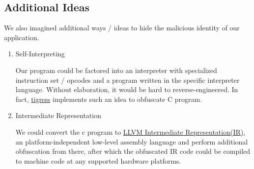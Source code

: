 \documentclass[11pt]{article}
\begin{document}
\subsection{Additional Ideas}
We also imagined additional ways / ideas to hide the malicious identity of our application.
\begin{enumerate}
    \item Self-Interpreting \par
    Our program could be factored into an interpreter with specialized instruction set / opcodes and a program written in the specific interpreter language. Without elaboration, it would be hard to reverse-engineered. In fact, \href{http://tigress.cs.arizona.edu/index.html}{tigress} implements such an idea to obfuscate C program.
    \item Intermediate Representation\par
    We could convert the c program to \href{https://llvm.org/docs/index.html}{LLVM Intermediate Representation(IR)}, an platform-independent low-level assembly language and perform additional obfuscation from there, after which the obfuscated IR code could be compiled to machine code at any supported hardware platforms. 
    
\end{enumerate}
\end{document}
